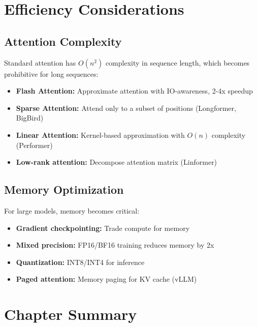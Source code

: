 \section{Efficiency Considerations}

\subsection{Attention Complexity}

Standard attention has $O(n^2)$ complexity in sequence length, which becomes prohibitive for long sequences:

\begin{itemize}
    \item \textbf{Flash Attention:} Approximate attention with IO-awareness, 2-4x speedup
    \item \textbf{Sparse Attention:} Attend only to a subset of positions (Longformer, BigBird)
    \item \textbf{Linear Attention:} Kernel-based approximation with $O(n)$ complexity (Performer)
    \item \textbf{Low-rank attention:} Decompose attention matrix (Linformer)
\end{itemize}

\subsection{Memory Optimization}

For large models, memory becomes critical:
\begin{itemize}
    \item \textbf{Gradient checkpointing:} Trade compute for memory
    \item \textbf{Mixed precision:} FP16/BF16 training reduces memory by 2x
    \item \textbf{Quantization:} INT8/INT4 for inference
    \item \textbf{Paged attention:} Memory paging for KV cache (vLLM)
\end{itemize}

\section{Chapter Summary}

